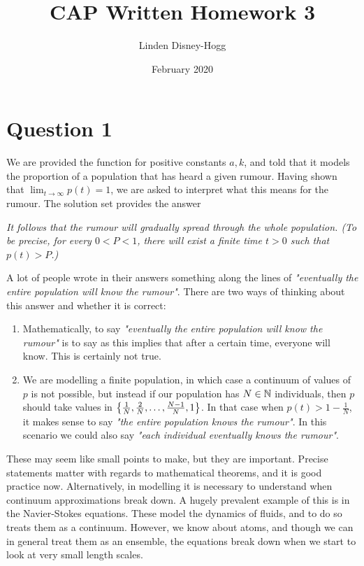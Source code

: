 \documentclass{article}
\title{CAP Written Homework 3}
\author{Linden Disney-Hogg}
\date{February 2020}
\begin{document}
\maketitle

\section{Question 1}

We are provided the function 
for positive constants $a,k$, and told that it models the proportion of a population that has heard a given rumour. Having shown that $\lim_{t \to \infty} p(t) = 1$, we are asked to interpret what this means for the rumour. The solution set provides the answer 
\begin{displayquote}
\textit{It follows that the rumour will gradually spread through the whole population. (To be precise, for every
$0 < P < 1$, there will exist a finite time $t > 0$ such that $p(t) > P$.)}
\end{displayquote}
A lot of people wrote in their answers something along the lines of \textit{"eventually the entire population will know the rumour"}. There are two ways of thinking about this answer and whether it is correct:
\begin{enumerate}
    \item Mathematically, to say \textit{"eventually the entire population will know the rumour"} is to say 
    as this implies that after a certain time, everyone will know. This is certainly not true.
    \item We are modelling a finite population, in which case a continuum of values of $p$ is not possible, but instead if our population has $N \in \mathbb{N}$ individuals, then $p$ should take values in $\left\{ \frac{1}{N}, \frac{2}{N}, \dots, \frac{N-1}{N}, 1 \right\}$. In that case when $p(t) > 1-\frac{1}{N}$, it makes sense to say \textit{"the entire population knows the rumour"}. In this scenario we could also say \textit{"each individual eventually knows the rumour"}.
\end{enumerate}
These may seem like small points to make, but they are important. Precise statements matter with regards to mathematical theorems, and it is good practice now. Alternatively, in modelling it is necessary to understand when continuum approximations break down. A hugely prevalent example of this is in the Navier-Stokes equations. These model the dynamics of fluids, and to do so treats them as a continuum. However, we know about atoms, and though we can in general treat them as an ensemble, the equations break down when we start to look at very small length scales. 
\end{document}
